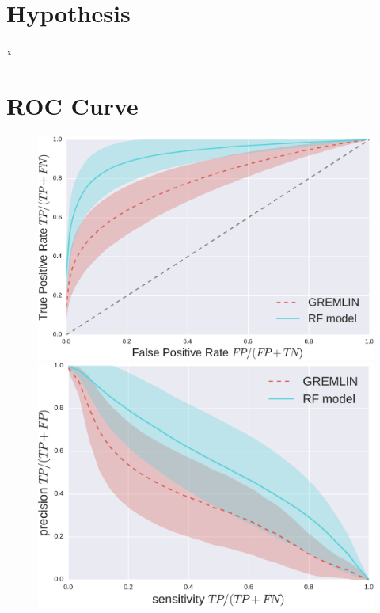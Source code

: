 \documentclass[landscape]{sciposter}
\newlength{\customfigheight}
\begin{document}
\begin{multicols}{3}
\section*{Hypothesis}
x
\columnbreak

\section*{ROC Curve}
\begin{figure}
    \center 
    \includegraphics[height=\customfigheight]{figures/GREMLIN_RF_ROC-crop.pdf}%
    \hfill%
    \includegraphics[height=\customfigheight]{figures/GREMLIN_RF_Acc_Pre-crop.pdf}%
\end{figure}

\columnbreak


\end{multicols}
\end{document}
